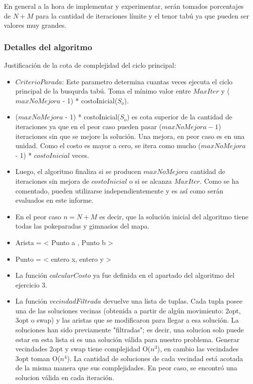 En general a la hora de implementar y experimentar, serán tomados porcentajes de $N+M$ para la cantidad de iteraciones límite y el tenor tabú ya que pueden ser valores muy grandes.\\

\subsubsection*{Detalles del algoritmo}
Justificación de la cota de complejidad del ciclo principal:
\begin{itemize}

\item $CriterioParada$: Este parametro determina cuantas veces ejecuta el ciclo principal de la busqurda tabú. Toma el mínimo valor entre $MaxIter$ y ($maxNoMejora$ - 1) * costoInicial($S_o$).
\item($maxNoMejora$ - 1) * costoInicial($S_o$) es cota superior de la cantidad de iteraciones ya que en el peor caso pueden pasar ($maxNoMejora - 1$) iteraciones sin que se mejore la solución. Una mejora, en peor caso es en una unidad. Como el costo es mayor a cero, se itera como mucho ($maxNoMejora$ - 1) * $costoInicial$ veces.
\item Luego, el algoritmo finaliza si se producen $maxNoMejora$ cantidad de iteraciones sin mejora de $costoInicial$ o si se alcanza $MaxIter$.  Como se ha comentado, pueden utilizarse independientemente y es así como serán evaluados en este informe.
\item En el peor caso $n = N+M$ es decir, que la solución inicial del algoritmo tiene todas las pokeparadas y gimnasios del mapa.
\item Arista = < Punto a , Punto b >
\item Punto = < entero x, entero y >
\item La función $calcularCosto$ ya fue definida en el apartado del algoritmo del ejercicio 3.
\item La función $vecindadFiltrada$ devuelve una lista de tuplas. Cada tupla posee una de las soluciones vecinas (obtenida a partir de algún movimiento: 2opt, 3opt o swap) y las aristas que se modificaron para llegar a esa solución. La soluciones han sido previamente "filtradas"; es decir, una solucion solo puede estar en esta lista si es una solución válida para nuestro problema. Generar vecindades 2opt y swap tiene complejidad O($n^3$), en cambio las vecindades 3opt toman O($n^4$).
	La cantidad de soluciones de cada vecindad está acotada de la misma manera que sus complejidades. En peor caso, se encontró una solucion válida en cada iteraci\'on.

\end{itemize}
